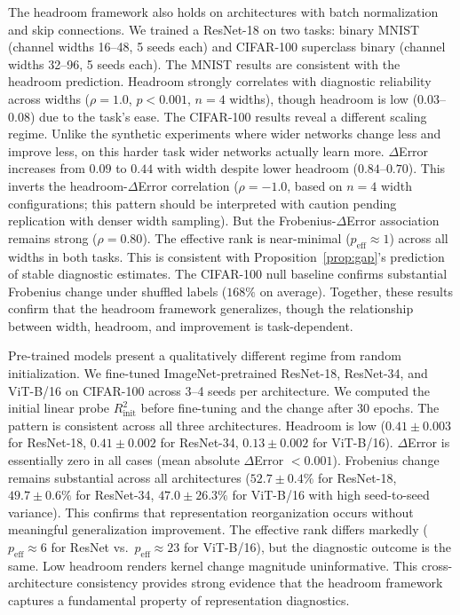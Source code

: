 \documentclass[twoside,11pt]{article}
\begin{document}
The headroom framework also holds on architectures with batch normalization and skip connections. We trained a ResNet-18 on two tasks: binary MNIST (channel widths 16--48, 5 seeds each) and CIFAR-100 superclass binary (channel widths 32--96, 5 seeds each). The MNIST results are consistent with the headroom prediction. Headroom strongly correlates with diagnostic reliability across widths ($\rho=1.0$, $p<0.001$, $n=4$ widths), though headroom is low ($0.03$--$0.08$) due to the task's ease. The CIFAR-100 results reveal a different scaling regime. Unlike the synthetic experiments where wider networks change less and improve less, on this harder task wider networks actually learn more. $\Delta$Error increases from $0.09$ to $0.44$ with width despite lower headroom ($0.84$--$0.70$). This inverts the headroom-$\Delta$Error correlation ($\rho=-1.0$, based on $n=4$ width configurations; this pattern should be interpreted with caution pending replication with denser width sampling). But the Frobenius-$\Delta$Error association remains strong ($\rho=0.80$). The effective rank is near-minimal ($p_{\text{eff}} \approx 1$) across all widths in both tasks. This is consistent with Proposition~\ref{prop:gap}'s prediction of stable diagnostic estimates. The CIFAR-100 null baseline confirms substantial Frobenius change under shuffled labels ($168\%$ on average). Together, these results confirm that the headroom framework generalizes, though the relationship between width, headroom, and improvement is task-dependent.

Pre-trained models present a qualitatively different regime from random initialization. We fine-tuned ImageNet-pretrained ResNet-18, ResNet-34, and ViT-B/16 on CIFAR-100 across 3--4 seeds per architecture. We computed the initial linear probe $R^2_{\text{init}}$ before fine-tuning and the change after 30 epochs. The pattern is consistent across all three architectures. Headroom is low ($0.41\pm0.003$ for ResNet-18, $0.41\pm0.002$ for ResNet-34, $0.13\pm0.002$ for ViT-B/16). $\Delta$Error is essentially zero in all cases (mean absolute $\Delta$Error $< 0.001$). Frobenius change remains substantial across all architectures ($52.7\pm0.4\%$ for ResNet-18, $49.7\pm0.6\%$ for ResNet-34, $47.0\pm26.3\%$ for ViT-B/16 with high seed-to-seed variance). This confirms that representation reorganization occurs without meaningful generalization improvement. The effective rank differs markedly ($p_{\text{eff}} \approx 6$ for ResNet vs.\ $p_{\text{eff}} \approx 23$ for ViT-B/16), but the diagnostic outcome is the same. Low headroom renders kernel change magnitude uninformative. This cross-architecture consistency provides strong evidence that the headroom framework captures a fundamental property of representation diagnostics.
\end{document}
